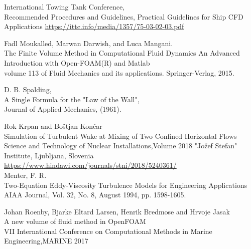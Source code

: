 \documentclass[a4paper, 12pt]{report}
\begin{document}
\begin{thebibliography}{9}
	International Towing Tank Conference,\\
	Recommended Procedures and Guidelines, Practical Guidelines for Ship CFD Applications
	\url{https://ittc.info/media/1357/75-03-02-03.pdf}
	
	Fadl Moukalled, Marwan Darwish, and Luca Mangani.\\
	The Finite Volume Method in Computational Fluid Dynamics An Advanced Introduction with 	Open-FOAM(R) and Matlab\\
	volume 113 of Fluid Mechanics and its applications. Springer-Verlag, 2015.
	
	D. B. Spalding,\\
	A Single Formula for the "Law of the Wall",\\ 
	Journal of Applied Mechanics, (1961).
	
	Rok Krpan and Boštjan Končar\\
	Simulation of Turbulent Wake at Mixing of Two Confined Horizontal Flows
	Science and Technology of Nuclear Installations,Volume 2018 "Jožef Stefan" Institute, 		Ljubljana, Slovenia
	\url{https://www.hindawi.com/journals/stni/2018/5240361/}\\
	
	Menter, F. R.\\
	Two-Equation Eddy-Viscosity Turbulence Models for Engineering Applications\\
	AIAA Journal, Vol. 32, No. 8, August 1994, pp. 1598-1605.
	
	Johan Roenby, Bjarke Eltard Larsen, Henrik Bredmose and Hrvoje Jasak\\
	A new volume of fluid method in OpenFOAM\\
	VII International Conference on Computational Methods in Marine Engineering,MARINE 			2017
	
\end{thebibliography}
\end{document}
